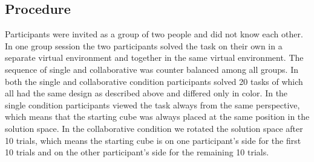 \documentclass{article}
\begin{document}
\subsection{Procedure}
Participants were invited as a group of two people and did not know each other. In one group session the two participants solved the task on their own in a separate virtual environment and together in the same virtual environment. The sequence of single and collaborative was counter balanced among all groups. In both the single and collaborative condition participants solved 20 tasks of which all had the same design as described above and differed only in color. In the single condition participants viewed the task always from the same perspective, which means that the starting cube was always placed at the same position in the solution space.
In the collaborative condition we rotated the solution space after 10 trials, which means the starting cube is on one participant's side for the first 10 trials and on the other participant's side for the remaining 10 trials. 
\end{document}
